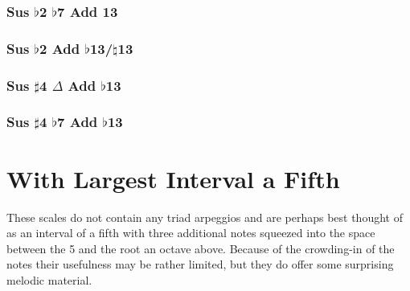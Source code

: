 \documentclass[english]{./gbook}
\begin{document}
\begin{large}
\subsubsection{Sus $\flat$2 $\flat$7 Add 13}

\subsubsection{Sus $\flat$2 Add $\flat$13/$\natural$13}

\subsubsection{Sus $\sharp$4 $\Delta$ Add $\flat$13}

\subsubsection{Sus $\sharp$4 $\flat$7 Add $\flat$13}



\section{With Largest Interval a Fifth}

These scales do not contain any triad arpeggios and are perhaps best thought of as an interval of a fifth with three additional notes squeezed into the space between the 5 and the root an octave above. Because of the crowding-in of the notes their usefulness may be rather limited, but they do offer some surprising melodic material.


\end{large}
\end{document}
